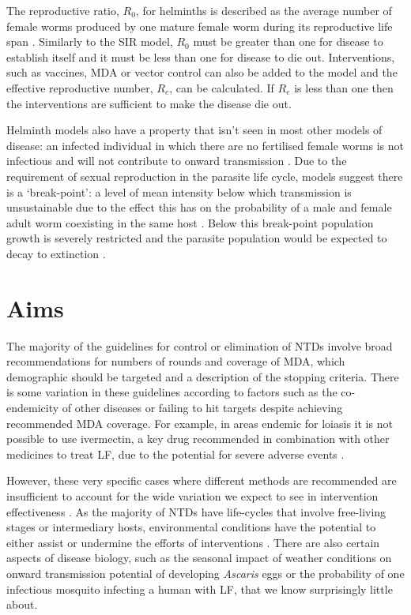 The reproductive ratio, $R_0$, for helminths is described as the average number of female worms produced by one mature female worm during its reproductive life span \cite{Anderson1992}. Similarly to the SIR model, $R_0$ must be greater than one for disease to establish itself and it must be less than one for disease to die out. Interventions, such as vaccines, MDA or vector control can also be added to the model and the effective reproductive number, $R_e$, can be calculated. If $R_e$ is less than one then the interventions are sufficient to make the disease die out.

Helminth models also have a property that isn't seen in most other models of disease: an infected individual in which there are no fertilised female worms is not infectious and will not contribute to onward transmission \cite{WHOLF}. Due to the requirement of sexual reproduction in the parasite life cycle, models suggest there is a `break-point': a level of mean intensity below which transmission is unsustainable due to the effect this has on the probability of a male and female adult worm coexisting in the same host \cite{Hardwick2019}. Below this break-point population growth is severely restricted and the parasite population would be expected to decay to extinction \cite{Anderson1985}. 

\section{Aims}

The majority of the guidelines for control or elimination of NTDs involve broad recommendations for numbers of rounds and coverage of MDA, which demographic should be targeted and a description of the stopping criteria. There is some variation in these guidelines according to factors such as the co-endemicity of other diseases or failing to hit targets despite achieving recommended MDA coverage. For example, in areas endemic for loiasis it is not possible to use ivermectin, a key drug recommended in combination with other medicines to treat LF, due to the potential for severe adverse events \cite{WHO_lfguideline}. 

However, these very specific cases where different methods are recommended are insufficient to account for the wide variation we expect to see in intervention effectiveness \cite{Dean2016}. As the majority of NTDs have life-cycles that involve free-living stages or intermediary hosts, environmental conditions have the potential to either assist or undermine the efforts of interventions \cite{Gunawardena,Zhang2013,LiTeng2017}. There are also certain aspects of disease biology, such as the seasonal impact of weather conditions on onward transmission potential of developing \textit{Ascaris} eggs or the probability of one infectious mosquito infecting a human with LF, that we know surprisingly little about.

